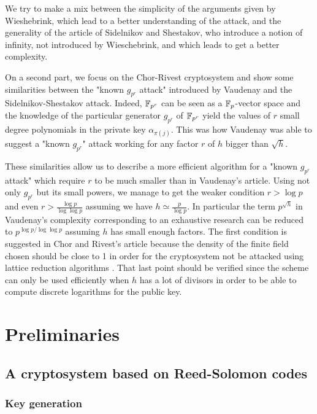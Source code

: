 \documentclass[a4paper]{article}
\begin{document}
We try to make a mix between the simplicity of the arguments given by Wieshebrink, which lead to a better understanding of the attack, and the generality of the article of Sidelnikov and Shestakov, who introduce a notion of infinity,
not introduced by Wieschebrink, and which leads to get a better complexity.


On a second part, we focus on the Chor-Rivest cryptosystem and show some similarities between the "known $g_{p^r}$ attack" introduced by Vaudenay and the Sidelnikov-Shestakov attack. Indeed, $\mathbb{F}_{p^r}$ can be seen as a $\mathbb{F}_p$-vector space and the knowledge of the particular generator $g_{p^r}$ of $\mathbb{F}_{p^r}$ yield the values of $r$ small degree polynomials in the private key $\alpha_{\pi(j)}$. This was how Vaudenay was able to suggest a "known $g_{p^r}$" attack working for any factor $r$ of $h$ bigger than $\sqrt{h}$.

These similarities allow us to describe a more efficient algorithm for a "known $g_{p^r}$ attack" which require $r$ to be much smaller than in Vaudenay's article. Using not only $g_{p^r}$ but its small powers, we manage to get the weaker condition $r > \log p$ and even $r > \frac{\log p}{\log \log p}$ assuming we have $h \simeq \frac{p}{\log p}$. In particular the term $p^{\sqrt{h}}$ in Vaudenay's complexity corresponding to an exhaustive research can be reduced to $p^{\log p / \log \log p}$ assuming $h$ has small enough factors. The first condition is suggested in Chor and Rivest's article because the density of the  finite field chosen should be close to 1 in order for the cryptosystem not be attacked using lattice reduction algorithms . That last point should be verified since the scheme can only be used efficiently when $h$ has a lot of divisors in order to be able to compute discrete logarithms for the public key.




\section{Preliminaries}
\label{sec:Prel}


\subsection{A cryptosystem based on Reed-Solomon codes}
\subsubsection{Key generation}
\end{document}
